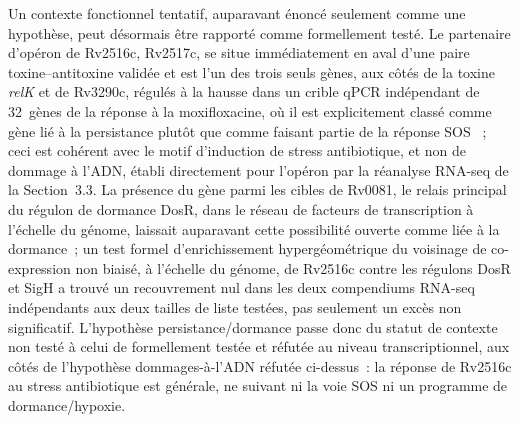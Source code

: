 \documentclass[11pt,a4paper]{article}
\begin{document}
Un contexte fonctionnel tentatif, auparavant énoncé seulement comme une hypothèse, peut désormais
être rapporté comme formellement testé. Le partenaire d'opéron de Rv2516c, Rv2517c, se
situe immédiatement en aval d'une paire toxine--antitoxine validée et est l'un des trois seuls
gènes, aux côtés de la toxine \textit{relK} et de Rv3290c, régulés à la hausse dans un crible qPCR
indépendant de 32~gènes de la réponse à la moxifloxacine, où il est explicitement classé comme gène
lié à la persistance plutôt que comme faisant partie de la réponse SOS
\citep{iacobino2021moxifloxacin}~; ceci est cohérent avec le motif d'induction de stress
antibiotique, et non de dommage à l'ADN, établi directement pour l'opéron par la réanalyse RNA-seq
de la Section~3.3. La présence du gène parmi les cibles de Rv0081, le relais principal du régulon de
dormance DosR, dans le réseau de facteurs de transcription à l'échelle du génome, laissait
auparavant cette possibilité ouverte comme liée à la dormance~; un test formel d'enrichissement
hypergéométrique du voisinage de co-expression non biaisé, à l'échelle du génome, de Rv2516c contre
les régulons DosR et SigH a trouvé un recouvrement nul dans les deux compendiums RNA-seq
indépendants aux deux tailles de liste testées, pas seulement un excès non significatif.
L'hypothèse persistance/dormance passe donc du statut de contexte non testé à celui de formellement
testée et réfutée au niveau transcriptionnel, aux côtés de l'hypothèse dommages-à-l'ADN réfutée
ci-dessus~: la réponse de Rv2516c au stress antibiotique est générale, ne suivant ni la voie SOS ni
un programme de dormance/hypoxie.
\end{document}
